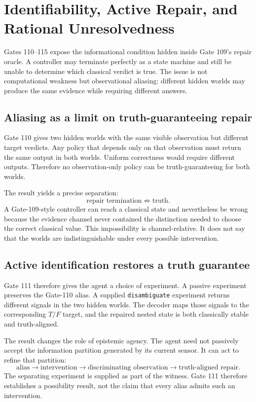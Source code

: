 \section{Identifiability, Active Repair, and Rational Unresolvedness}

Gates 110--115 expose the informational condition hidden inside Gate 109's repair oracle. A controller may terminate perfectly as a state machine and still be unable to determine which classical verdict is true. The issue is not computational weakness but observational aliasing: different hidden worlds may produce the same evidence while requiring different answers.

\subsection{Aliasing as a limit on truth-guaranteeing repair}

Gate 110 gives two hidden worlds with the same visible observation but different target verdicts. Any policy that depends only on that observation must return the same output in both worlds. Uniform correctness would require different outputs. Therefore no observation-only policy can be truth-guaranteeing for both worlds.

The result yields a precise separation:
\[
\text{repair termination}
\not\Rightarrow
\text{truth}.
\]
A Gate-109-style controller can reach a classical state and nevertheless be wrong because the evidence channel never contained the distinction needed to choose the correct classical value. This impossibility is channel-relative. It does not say that the worlds are indistinguishable under every possible intervention.

\subsection{Active identification restores a truth guarantee}

Gate 111 therefore gives the agent a choice of experiment. A passive experiment preserves the Gate-110 alias. A supplied \texttt{disambiguate} experiment returns different signals in the two hidden worlds. The decoder maps those signals to the corresponding $T/F$ target, and the repaired nested state is both classically stable and truth-aligned.

The result changes the role of epistemic agency. The agent need not passively accept the information partition generated by its current sensor. It can act to refine that partition:
\[
\text{alias}
\longrightarrow
\text{intervention}
\longrightarrow
\text{discriminating observation}
\longrightarrow
\text{truth-aligned repair}.
\]
The separating experiment is supplied as part of the witness. Gate 111 therefore establishes a possibility result, not the claim that every alias admits such an intervention.

